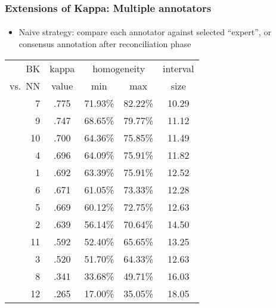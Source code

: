 \documentclass[t]{beamer} %
\begin{document}
\begin{frame}
  \frametitle{Extensions of Kappa: Multiple annotators}
  \framesubtitle{\citep{Krenn:Evert:Zinsmeister:04}}
  
  \begin{itemize}
  \item Naive strategy: compare each annotator against selected ``expert'', or
    consensus annotation after reconciliation phase
  \end{itemize}

\begin{center}
\footnotesize
\begin{tabular}{r|crrc}
\hline
BK & kappa & \multicolumn{2}{c}{homogeneity} & interval \\
vs.~NN & value & \multicolumn{1}{c}{min} & \multicolumn{1}{c}{max} & size \\
\hline
7 & .775 &  71.93\%  &  82.22\%  &  10.29 \\
9 & .747 &  68.65\%  &  79.77\%  &  11.12 \\
\hline
10& .700 &  64.36\%  &  75.85\%  &  11.49 \\
4 & .696 &  64.09\%  &  75.91\%  &  11.82  \\
1 & .692 &  63.39\%  &  75.91\%  &  12.52  \\
6 & .671 &  61.05\%  &  73.33\%  &  12.28  \\
5 & .669 &  60.12\%  &  72.75\%  &  12.63 \\
2 & .639 &  56.14\%  &  70.64\%  &  14.50 \\
11& .592 &  52.40\%  &  65.65\%  &  13.25 \\
3 & .520 &  51.70\%  &  64.33\%  &  12.63  \\
\hline
8 & .341 &  33.68\%  &  49.71\%  &  16.03 \\ 
12& .265 &  17.00\%  &  35.05\%  &  18.05 
\end{tabular}
\end{center}
\end{frame}
\end{document}
